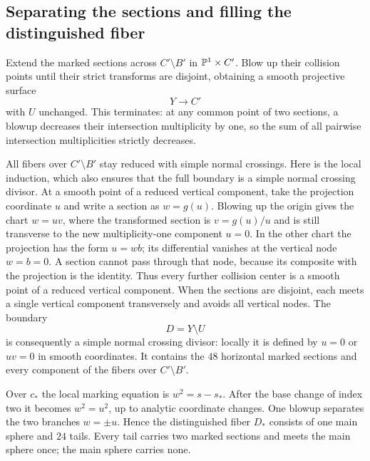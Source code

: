 \subsection{Separating the sections and filling the distinguished fiber}

Extend the marked sections across $C'\setminus B'$ in $\mathbb P^1\times C'$. Blow up their collision points until their strict transforms are disjoint, obtaining a smooth projective surface
\[
 Y\longrightarrow C'
\]
with $U$ unchanged. This terminates: at any common point of two sections, a blowup decreases their intersection multiplicity by one, so the sum of all pairwise intersection multiplicities strictly decreases.

All fibers over $C'\setminus B'$ stay reduced with simple normal crossings. Here is the local induction, which also ensures that the full boundary is a simple normal crossing divisor. At a smooth point of a reduced vertical component, take the projection coordinate $u$ and write a section as $w=g(u)$. Blowing up the origin gives the chart $w=uv$, where the transformed section is $v=g(u)/u$ and is still transverse to the new multiplicity-one component $u=0$. In the other chart the projection has the form $u=wb$; its differential vanishes at the vertical node $w=b=0$. A section cannot pass through that node, because its composite with the projection is the identity. Thus every further collision center is a smooth point of a reduced vertical component. When the sections are disjoint, each meets a single vertical component transversely and avoids all vertical nodes. The boundary
\[
 D=Y\setminus U
\]
is consequently a simple normal crossing divisor: locally it is defined
by $u=0$ or $uv=0$ in smooth coordinates. It contains the $48$
horizontal marked sections and every component of the fibers over
$C'\setminus B'$.

Over $c_*$ the local marking equation is $w^2=s-s_*$. After the base change of index two it becomes $w^2=u^2$, up to analytic coordinate changes. One blowup separates the two branches $w=\pm u$. Hence the distinguished fiber $D_*$ consists of one main sphere and $24$ tails. Every tail carries two marked sections and meets the main sphere once; the main sphere carries none.

